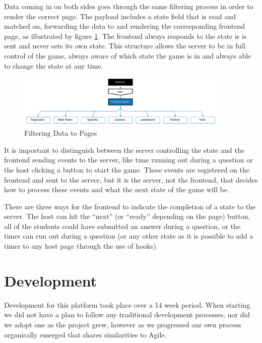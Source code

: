 \documentclass{article}
\begin{document}
            Data coming in on both sides goes through the same filtering process in order to render the correct page. The payload includes a state field that is read and matched on, forwarding the data to and rendering the corresponding frontend page, as illustrated by figure \ref{fig:frontend-pages}. The frontend always responds to the state is is sent and never sets its own state. This structure allows the server to be in full control of the game, always aware of which state the game is in and always able to change the state at any time.

            \begin{figure}[ht]
                \centering
                \includegraphics[width=0.9\textwidth]{images/frontend-pages.png}
                \caption{Filtering Data to Pages}
                \label{fig:frontend-pages}
            \end{figure}
            
            It is important to distinguish between the server controlling the state and the frontend sending events to the server, like time running out during a question or the host clicking a button to start the game. These events are registered on the frontend and sent to the server, but it is the server, not the frontend, that decides how to process these events and what the next state of the game will be.
            
            \smallskip
            There are three ways for the frontend to indicate the completion of a state to the server. The host can hit the ``next'' (or ``ready'' depending on the page) button, all of the students could have submitted an answer during a question, or the timer can run out during a question (or any other state as it is possible to add a timer to any host page through the use of hooks).

\section{Development}
    Development for this platform took place over a 14 week period. When starting we did not have a plan to follow any traditional development processes, nor did we adopt one as the project grew, however as we progressed our own process organically emerged that shares similarities to Agile.
    \smallskip
    
\end{document}
